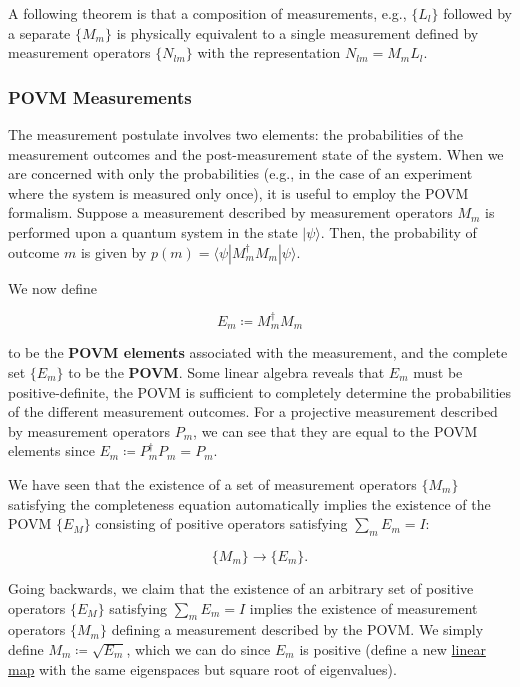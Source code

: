 \documentclass{article}
\newcounter{theorem}[section]
\begin{document}
      \begin{theorem}
        \label{thm:composition-of-measurements}
      A following theorem is that a composition of measurements, e.g., $\{L_l\}$ followed by a separate $\{M_m\}$ is physically equivalent to a single measurement defined by measurement operators $\{N_{lm}\}$ with the representation $N_{lm} = M_m L_l$.  
      \end{theorem}

    \subsubsection{POVM Measurements} 

      The measurement postulate involves two elements: the probabilities of the measurement outcomes and the post-measurement state of the system. When we are concerned with only the probabilities (e.g., in the case of an experiment where the system is measured only once), it is useful to employ the POVM formalism. Suppose a measurement described by measurement operators $M_m$ is performed upon a quantum system in the state $|\psi\rangle$. Then, the probability of outcome $m$ is given by $p(m) = \langle \psi | M_m^\dagger M_m | \psi \rangle$. 

      We now define

        \begin{equation}
          E_m \coloneqq M_m^\dagger M_m
        \end{equation}

      to be the \textbf{POVM elements} associated with the measurement, and the complete set $\{E_m\}$ to be the \textbf{POVM}. Some linear algebra reveals that $E_m$ must be positive-definite, the POVM is sufficient to completely determine the probabilities of the different measurement outcomes. For a projective measurement described by measurement operators $P_m$, we can see that they are equal to the POVM elements since $E_m \coloneqq P_m^\dagger P_m = P_m$.

      We have seen that the existence of a set of measurement operators $\{M_m\}$ satisfying the completeness equation automatically implies the existence of the POVM $\{E_M\}$ consisting of positive operators satisfying $\sum_m E_m = I$:

        \begin{equation}
          \{M_m\} \to \{E_m\}.
        \end{equation}

      Going backwards, we claim that the existence of an arbitrary set of positive operators $\{E_M\}$ satisfying $\sum_m E_m = I$ implies the existence of measurement operators $\{M_m\}$ defining a measurement described by the POVM. We simply define $M_m \coloneqq \sqrt{E_m}$, which we can do since $E_m$ is positive (define a new \hyperref[lin-def:linear_map]{linear map} with the same eigenspaces but square root of eigenvalues).
\end{document}

